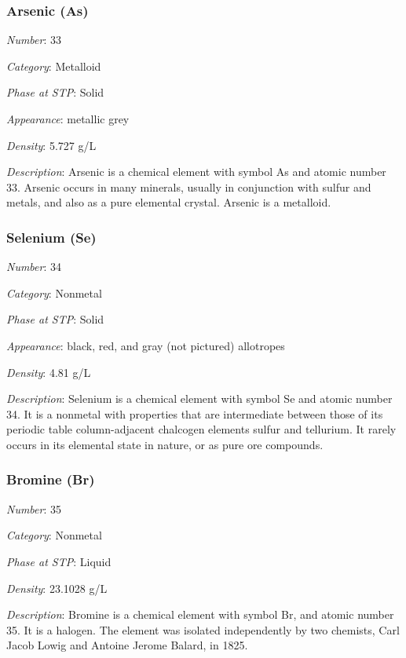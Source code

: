 \documentclass{article}
\begin{document}
\hypertarget{subsubsection::As}{}\subsubsection{Arsenic (As)}

\textit{Number}: 33

\textit{Category}: Metalloid

\textit{Phase at STP}: Solid

\textit{Appearance}: metallic grey

\textit{Density}: 5.727 g/L

\textit{Description}: Arsenic is a chemical element with symbol As and atomic number 33. Arsenic occurs in many minerals, usually in conjunction with sulfur and metals, and also as a pure elemental crystal. Arsenic is a metalloid.

\hypertarget{subsubsection::Se}{}\subsubsection{Selenium (Se)}

\textit{Number}: 34

\textit{Category}: Nonmetal

\textit{Phase at STP}: Solid

\textit{Appearance}: black, red, and gray (not pictured) allotropes

\textit{Density}: 4.81 g/L

\textit{Description}: Selenium is a chemical element with symbol Se and atomic number 34. It is a nonmetal with properties that are intermediate between those of its periodic table column-adjacent chalcogen elements sulfur and tellurium. It rarely occurs in its elemental state in nature, or as pure ore compounds.

\hypertarget{subsubsection::Br}{}\subsubsection{Bromine (Br)}

\textit{Number}: 35

\textit{Category}: Nonmetal

\textit{Phase at STP}: Liquid

\textit{Density}: 23.1028 g/L

\textit{Description}: Bromine is a chemical element with symbol Br, and atomic number 35. It is a halogen. The element was isolated independently by two chemists, Carl Jacob Lowig and Antoine Jerome Balard, in 1825.
\end{document}
